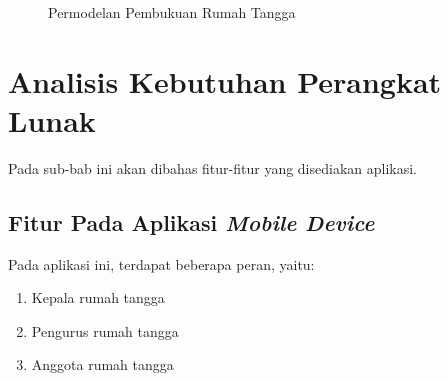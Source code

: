 \begin{figure}
\centering
{}
\caption[Permodelan Pembukuan Rumah Tangga]{Permodelan Pembukuan Rumah Tangga} 
\label{fig:prt_architecture}
\end{figure}

\section{Analisis Kebutuhan Perangkat Lunak}

\hspace{0,5cm}Pada sub-bab ini akan dibahas fitur-fitur yang disediakan aplikasi.

\subsection{Fitur Pada Aplikasi \textit{Mobile Device}}

\hspace{0,5cm}Pada aplikasi ini, terdapat beberapa peran, yaitu:
\begin{enumerate}
	\item Kepala rumah tangga
	\item	Pengurus rumah tangga
	\item Anggota rumah tangga
\end{enumerate}

